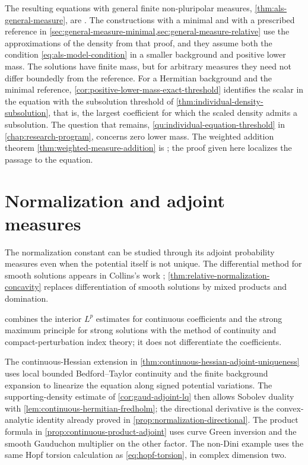 The resulting equations with general finite non-pluripolar measures, \cref{thm:als-general-measure}, are \cite[Theorem~5.8 and Corollary~5.9, pp.~38--40]{ALS26}. The constructions with a minimal and with a prescribed reference in \cref{sec:general-measure-minimal,sec:general-measure-relative} use the approximations of the density from that proof, and they assume both the condition \eqref{eq:als-model-condition} in a smaller background and positive lower mass. The solutions have finite mass, but for arbitrary measures they need not differ boundedly from the reference. For a Hermitian background and the minimal reference, \cref{cor:positive-lower-mass-exact-threshold} identifies the scalar in the equation with the subsolution threshold of \cref{thm:individual-density-subsolution}, that is, the largest coefficient for which the scaled density admits a subsolution. The question that remains, \cref{qu:individual-equation-threshold} in \cref{chap:research-program}, concerns zero lower mass. The weighted addition theorem \cref{thm:weighted-measure-addition} is \cite[Theorem~5.2, p.~30]{ALS26}; the proof given here localizes the passage to the equation.

\section{Normalization and adjoint measures}
\label{sec:history-normalization}

The normalization constant can be studied through its adjoint probability measures even when the potential itself is not unique. The differential method for smooth solutions appears in Collins's work \cite{Collins21}; \cref{thm:relative-normalization-concavity} replaces differentiation of smooth solutions by mixed products and domination.

 combines the interior $L^p$ estimates for continuous coefficients and the strong maximum principle for strong solutions \cite[Theorems~9.11 and~9.6]{GT01} with the method of continuity \cite[Theorem~5.2]{GT01} and compact-perturbation index theory; it does not differentiate the coefficients.

The continuous-Hessian extension in \cref{thm:continuous-hessian-adjoint-uniqueness} uses local bounded Bedford--Taylor continuity and the finite background expansion to linearize the equation along signed potential variations. The supporting-density estimate of \cref{cor:gaud-adjoint-lq} then allows Sobolev duality with \cref{lem:continuous-hermitian-fredholm}; the directional derivative is the convex-analytic identity already proved in \cref{prop:normalization-directional}. The product formula in \cref{prop:continuous-product-adjoint} uses curve Green inversion and the smooth Gauduchon multiplier on the other factor. The non-Dini example uses the same Hopf torsion calculation as \eqref{eq:hopf-torsion}, in complex dimension two.


